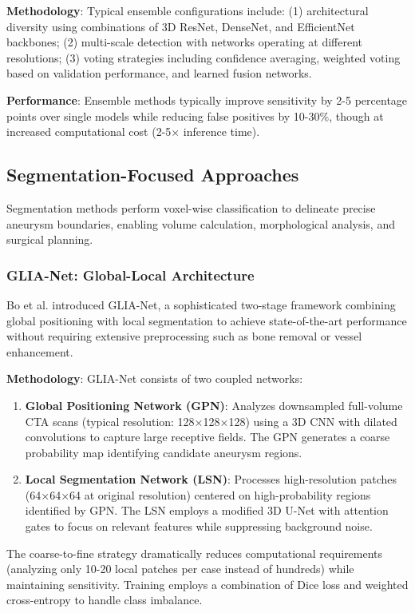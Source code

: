 \documentclass[conference]{IEEEtran}
\begin{document}
\textbf{Methodology}: Typical ensemble configurations include: (1) architectural diversity using combinations of 3D ResNet, DenseNet, and EfficientNet backbones; (2) multi-scale detection with networks operating at different resolutions; (3) voting strategies including confidence averaging, weighted voting based on validation performance, and learned fusion networks.

\textbf{Performance}: Ensemble methods typically improve sensitivity by 2-5 percentage points over single models while reducing false positives by 10-30\%, though at increased computational cost (2-5× inference time).

\subsection{Segmentation-Focused Approaches}

Segmentation methods perform voxel-wise classification to delineate precise aneurysm boundaries, enabling volume calculation, morphological analysis, and surgical planning.

\subsubsection{GLIA-Net: Global-Local Architecture}
Bo et al. \cite{bo2021toward} introduced GLIA-Net, a sophisticated two-stage framework combining global positioning with local segmentation to achieve state-of-the-art performance without requiring extensive preprocessing such as bone removal or vessel enhancement.

\textbf{Methodology}: GLIA-Net consists of two coupled networks:
\begin{enumerate}
    \item \textbf{Global Positioning Network (GPN)}: Analyzes downsampled full-volume CTA scans (typical resolution: 128×128×128) using a 3D CNN with dilated convolutions to capture large receptive fields. The GPN generates a coarse probability map identifying candidate aneurysm regions.
    \item \textbf{Local Segmentation Network (LSN)}: Processes high-resolution patches (64×64×64 at original resolution) centered on high-probability regions identified by GPN. The LSN employs a modified 3D U-Net with attention gates to focus on relevant features while suppressing background noise.
\end{enumerate}

The coarse-to-fine strategy dramatically reduces computational requirements (analyzing only 10-20 local patches per case instead of hundreds) while maintaining sensitivity. Training employs a combination of Dice loss and weighted cross-entropy to handle class imbalance.
\end{document}
